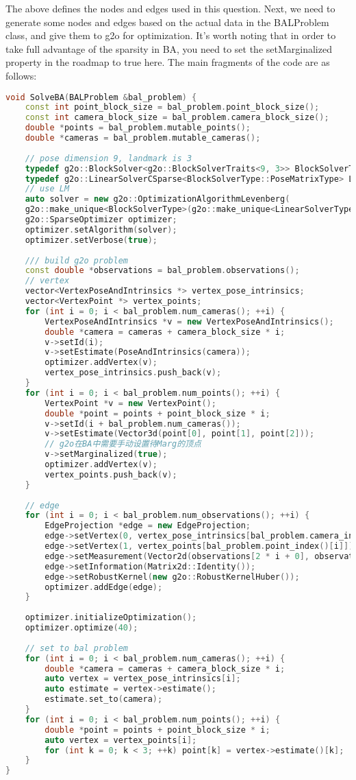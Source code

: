 The above defines the nodes and edges used in this question. Next, we need to generate some nodes and edges based on the actual data in the BALProblem class, and give them to g2o for optimization. It's worth noting that in order to take full advantage of the sparsity in BA, you need to set the setMarginalized property in the roadmap to true here. The main fragments of the code are as follows:
\begin{lstlisting}[language=c++,caption=slambook2/ch9/bundle_adjustment_g2o(fragment)]
void SolveBA(BALProblem &bal_problem) {
	const int point_block_size = bal_problem.point_block_size();
	const int camera_block_size = bal_problem.camera_block_size();
	double *points = bal_problem.mutable_points();
	double *cameras = bal_problem.mutable_cameras();
	
	// pose dimension 9, landmark is 3
	typedef g2o::BlockSolver<g2o::BlockSolverTraits<9, 3>> BlockSolverType;
	typedef g2o::LinearSolverCSparse<BlockSolverType::PoseMatrixType> LinearSolverType;
	// use LM
	auto solver = new g2o::OptimizationAlgorithmLevenberg(
	g2o::make_unique<BlockSolverType>(g2o::make_unique<LinearSolverType>()));
	g2o::SparseOptimizer optimizer;
	optimizer.setAlgorithm(solver);
	optimizer.setVerbose(true);
	
	/// build g2o problem
	const double *observations = bal_problem.observations();
	// vertex
	vector<VertexPoseAndIntrinsics *> vertex_pose_intrinsics;
	vector<VertexPoint *> vertex_points;
	for (int i = 0; i < bal_problem.num_cameras(); ++i) {
		VertexPoseAndIntrinsics *v = new VertexPoseAndIntrinsics();
		double *camera = cameras + camera_block_size * i;
		v->setId(i);
		v->setEstimate(PoseAndIntrinsics(camera));
		optimizer.addVertex(v);
		vertex_pose_intrinsics.push_back(v);
	}
	for (int i = 0; i < bal_problem.num_points(); ++i) {
		VertexPoint *v = new VertexPoint();
		double *point = points + point_block_size * i;
		v->setId(i + bal_problem.num_cameras());
		v->setEstimate(Vector3d(point[0], point[1], point[2]));
		// g2o在BA中需要手动设置待Marg的顶点
		v->setMarginalized(true);
		optimizer.addVertex(v);
		vertex_points.push_back(v);
	}
	
	// edge
	for (int i = 0; i < bal_problem.num_observations(); ++i) {
		EdgeProjection *edge = new EdgeProjection;
		edge->setVertex(0, vertex_pose_intrinsics[bal_problem.camera_index()[i]]);
		edge->setVertex(1, vertex_points[bal_problem.point_index()[i]]);
		edge->setMeasurement(Vector2d(observations[2 * i + 0], observations[2 * i + 1]));
		edge->setInformation(Matrix2d::Identity());
		edge->setRobustKernel(new g2o::RobustKernelHuber());
		optimizer.addEdge(edge);
	}
	
	optimizer.initializeOptimization();
	optimizer.optimize(40);
	
	// set to bal problem
	for (int i = 0; i < bal_problem.num_cameras(); ++i) {
		double *camera = cameras + camera_block_size * i;
		auto vertex = vertex_pose_intrinsics[i];
		auto estimate = vertex->estimate();
		estimate.set_to(camera);
	}
	for (int i = 0; i < bal_problem.num_points(); ++i) {
		double *point = points + point_block_size * i;
		auto vertex = vertex_points[i];
		for (int k = 0; k < 3; ++k) point[k] = vertex->estimate()[k];
	}
}
\end{lstlisting}
